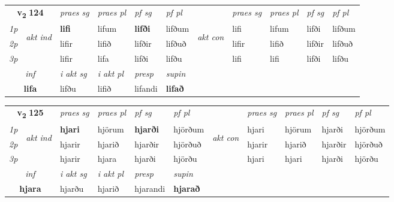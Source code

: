 \noindent
\begin{tabular}{lllllllllll} \toprule
\multicolumn{2}{c}{\textbf{v{\textsubscript{2}}} \Large{\textbf{124}}}  &  \textit{praes sg}  & \textit{praes pl}  &\textit{ pf sg} & \textit{pf pl} &  &  \textit{praes sg}  & \textit{praes pl}  & \textit{pf sg} & \textit{pf pl } \\*
	\cmidrule{3-6} \cmidrule{8-11}
 {\textit{1p}} & \multirow{3}{*}{\begin{turn}{90}\textit{akt ind}\end{turn}} & \textbf{lifi} & lifum & \textbf{lifði} & lifðum & \multirow{3}{*}{\begin{turn}{90}\textit{akt con}\end{turn}} &lifi & lifum & lifði & lifðum\\*
 {\textit{2p}} &  &  lifir  & lifið & lifðir & lifðuð & & lifir & lifið & lifðir & lifðuð \\*
{\textit{3p}} &  & lifir & lifa & lifði & lifðu & & lifi & lifi& lifði & lifðu \\*
\cmidrule{3-6} \cmidrule{8-11}

   \multicolumn{2}{c}{\textit{inf}}  & \textit{i akt sg} & \textit{i akt pl}   & \textit{presp} & \textit{supin}   \\*
  \multicolumn{2}{c}{\textbf{lifa}} & lifðu  & lifið   & lifandi &  \textbf{lifað}   \\*
\end{tabular}

\noindent
\begin{tabular}{lllllllllll} \toprule
\multicolumn{2}{c}{\textbf{v{\textsubscript{2}}} \Large{\textbf{125}}}  &  \textit{praes sg}  & \textit{praes pl}  &\textit{ pf sg} & \textit{pf pl} &  &  \textit{praes sg}  & \textit{praes pl}  & \textit{pf sg} & \textit{pf pl } \\*
	\cmidrule{3-6} \cmidrule{8-11}
 {\textit{1p}} & \multirow{3}{*}{\begin{turn}{90}\textit{akt ind}\end{turn}} & \textbf{hjari} & hjörum & \textbf{hjarði} & hjörðum & \multirow{3}{*}{\begin{turn}{90}\textit{akt con}\end{turn}} &hjari & hjörum & hjarði & hjörðum\\*
 {\textit{2p}} &  &  hjarir  & hjarið & hjarðir & hjörðuð & & hjarir & hjarið & hjarðir & hjörðuð \\*
{\textit{3p}} &  & hjarir & hjara & hjarði & hjörðu & & hjari & hjari& hjarði & hjörðu \\*
\cmidrule{3-6} \cmidrule{8-11}

   \multicolumn{2}{c}{\textit{inf}}  & \textit{i akt sg} & \textit{i akt pl}   & \textit{presp} & \textit{supin}   \\*
  \multicolumn{2}{c}{\textbf{hjara}} & hjarðu  & hjarið   & hjarandi &  \textbf{hjarað}   \\*
\end{tabular}

